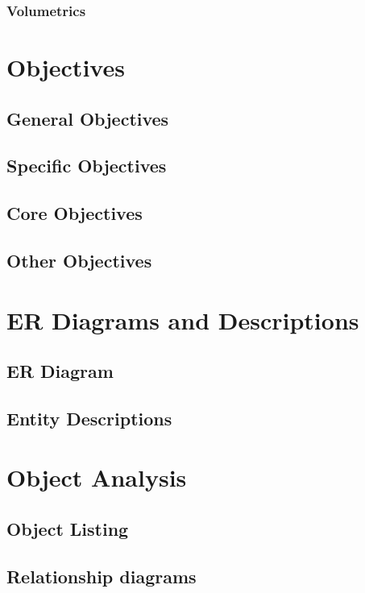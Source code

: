 \subsubsection{Volumetrics}

\section{Objectives}

\subsection{General Objectives}

\subsection{Specific Objectives}

\subsection{Core Objectives}

\subsection{Other Objectives}

\section{ER Diagrams and Descriptions}

\subsection{ER Diagram}

\subsection{Entity Descriptions}

\section{Object Analysis}

\subsection{Object Listing}

\subsection{Relationship diagrams}

